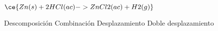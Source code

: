 $\ce{Zn(s) + 2HCl(ac) -> ZnCl2(ac) + H2(g)}$

\begin{choices}
    \choice Descomposición
    \choice Combinación
    \CorrectChoice Desplazamiento
    \choice Doble desplazamiento
\end{choices}